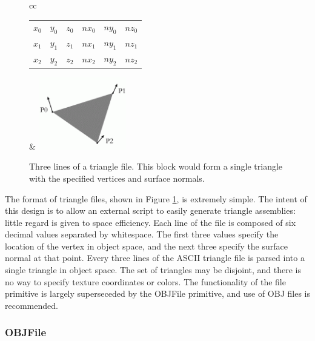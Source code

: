 
\begin{figure}[htb]
 \begin{center} 
 \begin{tabular}[t]{cc} 
  \begin{tabular}[b]{ccc ccc}
        $x_0$ & $y_0$ & $z_0$ & $nx_0$ & $ny_0$ & $nz_0$ \\
        $x_1$ & $y_1$ & $z_1$ & $nx_1$ & $ny_1$ & $nz_1$  \\
        $x_2$ & $y_2$ & $z_2$ & $nx_2$ & $ny_2$ & $nz_2$ 
        \end{tabular} & \includegraphics[width=1.5in]{pics/tris.png}
 \end{tabular} 
 \end{center} 
 \caption[Three lines of a triangle file]{Three lines of a triangle file.  This block would form a single triangle with the specified vertices and surface normals.}
 \label{fig:TriangleFile}
\end{figure}

The format of triangle files, shown in Figure \ref{fig:TriangleFile}, is extremely simple.  The intent of this design is to allow an external script to easily generate triangle assemblies: little regard is given to space efficiency.  Each line of the file is composed of six decimal values separated by whitespace.  The first three values specify the location of the vertex in object space, and the next three specify the surface normal at that point.  Every three lines of the ASCII triangle file is parsed into a single triangle in object space.  The set of triangles may be disjoint, and there is no way to specify texture coordinates or colors.  The functionality of the file primitive is largely superseceded by the OBJFile primitive, and use of OBJ files is recommended.

\subsubsection{OBJFile}

